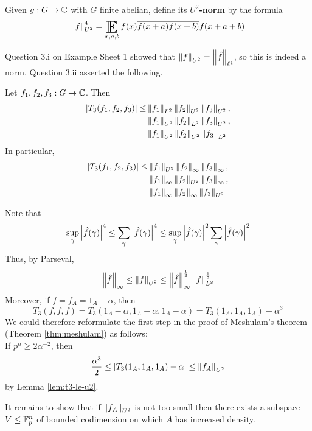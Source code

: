 \documentclass{article}
\begin{document}
\begin{ndef}
  Given $g : G \to \mathbb C$ with $G$ finite abelian, define its {\bf $U^2$-norm} by the formula
  $$\norm f_{U^2}^4 = \E_{x, a, b} f(x) \overline{f(x + a) f(x + b)} f(x + a + b)$$
\end{ndef}

Question 3.i on Example Sheet 1 showed that $\left\lVert f\right\rVert_{U^2} = \left\lVert \hat f\right\rVert_{\ell^4}$, so this is indeed a norm. Question 3.ii asserted the following.

\begin{nlemma}\label{lem:t3-le-u2}
  Let $f_1, f_2, f_3 : G \to \mathbb C$. Then
  \begin{align*}
    \left\lvert T_3(f_1, f_2, f_3)\right\rvert \le
    & \left\lVert f_1\right\rVert_{L^2} \left\lVert f_2\right\rVert_{U^2} \left\lVert f_3\right\rVert_{U^2}, \\
    & \left\lVert f_1\right\rVert_{U^2} \left\lVert f_2\right\rVert_{L^2} \left\lVert f_3\right\rVert_{U^2}, \\
    & \left\lVert f_1\right\rVert_{U^2} \left\lVert f_2\right\rVert_{U^2} \left\lVert f_3\right\rVert_{L^2}
  \end{align*}
  In particular,
  \begin{align*}
    \left\lvert T_3(f_1, f_2, f_3)\right\rvert \le
    & \left\lVert f_1\right\rVert_{U^2} \left\lVert f_2\right\rVert_\infty \left\lVert f_3\right\rVert_\infty, \\
    & \left\lVert f_1\right\rVert_\infty \left\lVert f_2\right\rVert_{U^2} \left\lVert f_3\right\rVert_\infty, \\
    & \left\lVert f_1\right\rVert_\infty \left\lVert f_2\right\rVert_\infty \left\lVert f_3\right\rVert_{U^2}
  \end{align*}
\end{nlemma}

Note that
$$\sup_\gamma \left\lvert \hat f(\gamma)\right\rvert^4 \le \sum_\gamma \left\lvert \hat f(\gamma)\right\rvert^4 \le \sup_\gamma \left\lvert \hat f(\gamma)\right\rvert^2 \sum_\gamma \left\lvert \hat f(\gamma)\right\rvert^2$$
Thus, by Parseval,
$$\left\lVert \hat f\right\rVert_\infty \le \left\lVert f\right\rVert_{U^2} \le \left\lVert \hat f\right\rVert_\infty^{\frac 12} \left\lVert f\right\rVert_{L^2}^{\frac 12}$$
Moreover, if $f = f_A = 1_A - \alpha$, then
$$T_3(f, f, f) = T_3(1_A - \alpha, 1_A - \alpha, 1_A - \alpha) = T_3(1_A, 1_A, 1_A) - \alpha^3$$
We could therefore reformulate the first step in the proof of Meshulam's theorem (Theorem \ref{thm:meshulam}) as follows: \\
If $p^n \ge 2\alpha^{-2}$, then
$$\frac{\alpha^3}2 \le \left\lvert T_3(1_A, 1_A, 1_A) - \alpha\right\rvert \le \left\lVert f_A\right\rVert_{U^2}$$
by Lemma \ref{lem:t3-le-u2}.

\newlec 

It remains to show that if $\left\lVert f_A\right\rVert_{U^2}$ is not too small then there exists a subspace $V \le \mathbb F_p^n$ of bounded codimension on which $A$ has increased density.
\end{document}
